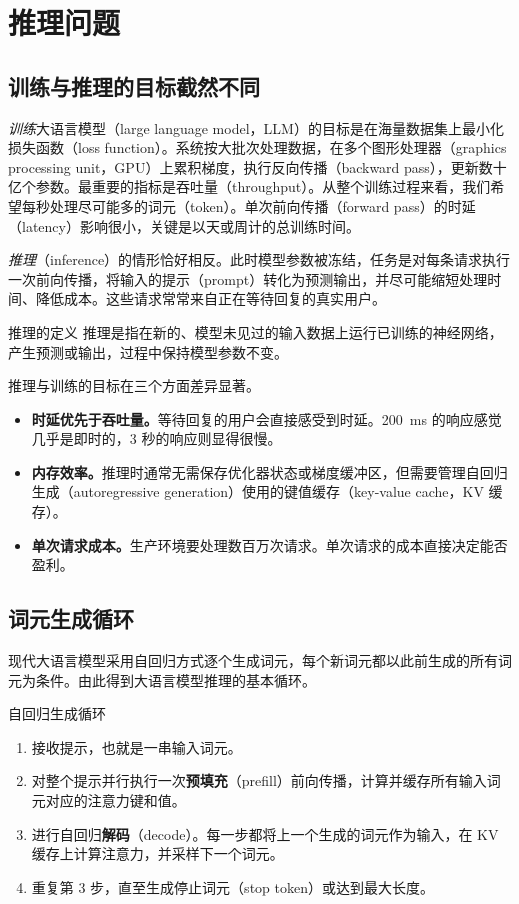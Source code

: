 \chapter{推理问题}
\label{ch:inference-problem}

\section{训练与推理的目标截然不同}

\emph{训练}大语言模型（large language model，LLM）的目标是在海量数据集上最小化损失函数（loss function）。系统按大批次处理数据，在多个图形处理器（graphics processing unit，GPU）上累积梯度，执行反向传播（backward pass），更新数十亿个参数。最重要的指标是吞吐量（throughput）。从整个训练过程来看，我们希望每秒处理尽可能多的词元（token）。单次前向传播（forward pass）的时延（latency）影响很小，关键是以天或周计的总训练时间。

\emph{推理}（inference）的情形恰好相反。此时模型参数被冻结，任务是对每条请求执行一次前向传播，将输入的提示（prompt）转化为预测输出，并尽可能缩短处理时间、降低成本。这些请求常常来自正在等待回复的真实用户。

\begin{definitionbox}{推理的定义}
推理是指在新的、模型未见过的输入数据上运行已训练的神经网络，产生预测或输出，过程中保持模型参数不变。
\end{definitionbox}

推理与训练的目标在三个方面差异显著。

\begin{itemize}
  \item \textbf{时延优先于吞吐量。}等待回复的用户会直接感受到时延。200~ms 的响应感觉几乎是即时的，3 秒的响应则显得很慢。
  \item \textbf{内存效率。}推理时通常无需保存优化器状态或梯度缓冲区，但需要管理自回归生成（autoregressive generation）使用的键值缓存（key-value cache，KV 缓存）。
  \item \textbf{单次请求成本。}生产环境要处理数百万次请求。单次请求的成本直接决定能否盈利。
\end{itemize}

\section{词元生成循环}

现代大语言模型采用自回归方式逐个生成词元，每个新词元都以此前生成的所有词元为条件。由此得到大语言模型推理的基本循环。

\begin{conceptbox}{自回归生成循环}
\begin{enumerate}
  \item 接收提示，也就是一串输入词元。
  \item 对整个提示并行执行一次\textbf{预填充}（prefill）前向传播，计算并缓存所有输入词元对应的注意力键和值。
  \item 进行自回归\textbf{解码}（decode）。每一步都将上一个生成的词元作为输入，在 KV 缓存上计算注意力，并采样下一个词元。
  \item 重复第 3 步，直至生成停止词元（stop token）或达到最大长度。
\end{enumerate}
\end{conceptbox}

